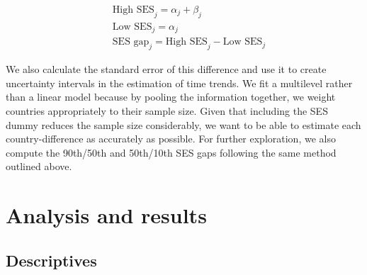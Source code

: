 \documentclass[11pt, a4paper]{article}\usepackage[]{graphicx}\usepackage[]{color}
\begin{document}
\begin{equation}
\begin{split}
\quad \text{High SES}_j = \alpha_j + \beta_j \\
\quad \text{Low SES}_j = \alpha_j \\
\quad \text{SES gap}_j = \text{High SES}_j - \text{Low SES}_j
\end{split}
\end{equation}

We also calculate the standard error of this difference and use it to create uncertainty intervals in the estimation of time trends. We fit a multilevel rather than a linear model because by pooling the information together, we weight countries appropriately to their sample size. Given that including the SES dummy reduces the sample size considerably, we want to be able to estimate each country-difference as accurately as possible. For further exploration, we also compute the 90th/50th and 50th/10th SES gaps following the same method outlined above.

\section{Analysis and results}

\subsection{Descriptives}
\end{document}
